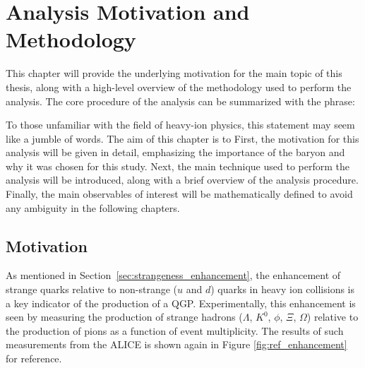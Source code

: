 \chapter{Analysis Motivation and Methodology}
\label{ch:analysis_mnm}

This chapter will provide the underlying motivation for the main topic of this thesis, along with a high-level overview of the methodology used to perform the analysis. The core procedure of the analysis can be summarized with the phrase:
\begin{center}
\end{center}
To those unfamiliar with the field of heavy-ion physics, this statement may seem like a jumble of words. The aim of this chapter is to 
First, the motivation for this analysis will be given in detail, emphasizing the importance of the \lmb baryon and why it was chosen for this study. Next, the main technique used to perform the analysis will be introduced, along with a brief overview of the analysis procedure. Finally, the main observables of interest will be mathematically defined to avoid any ambiguity in the following chapters.

\section{Motivation}
As mentioned in Section~\ref{sec:strangeness_enhancement}, the enhancement of strange quarks relative to non-strange ($u$ and $d$) quarks in heavy ion collisions is a key indicator of the production of a QGP. Experimentally, this enhancement is seen by measuring the production of strange hadrons ($\Lambda$, $K^0$, $\phi$, $\Xi$, $\Omega$) relative to the production of pions as a function of event multiplicity. The results of such measurements from the ALICE is shown again in Figure \ref{fig:ref_enhancement} for reference. 

